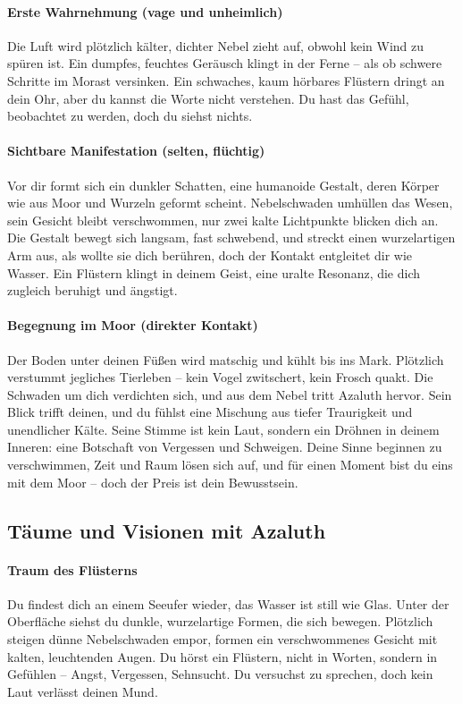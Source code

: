 \paragraph{Erste Wahrnehmung (vage und unheimlich)}
Die Luft wird plötzlich kälter, dichter Nebel zieht auf, obwohl kein Wind zu spüren ist.
Ein dumpfes, feuchtes Geräusch klingt in der Ferne – als ob schwere Schritte im Morast versinken.
Ein schwaches, kaum hörbares Flüstern dringt an dein Ohr, aber du kannst die Worte nicht verstehen.
Du hast das Gefühl, beobachtet zu werden, doch du siehst nichts.
\paragraph{Sichtbare Manifestation (selten, flüchtig)}
Vor dir formt sich ein dunkler Schatten, eine humanoide Gestalt, deren Körper wie aus Moor und Wurzeln geformt scheint.
Nebelschwaden umhüllen das Wesen, sein Gesicht bleibt verschwommen, nur zwei kalte Lichtpunkte blicken dich an.
Die Gestalt bewegt sich langsam, fast schwebend, und streckt einen wurzelartigen Arm aus, als wollte sie dich berühren, doch der Kontakt entgleitet dir wie Wasser.
Ein Flüstern klingt in deinem Geist, eine uralte Resonanz, die dich zugleich beruhigt und ängstigt.
\paragraph{Begegnung im Moor (direkter Kontakt)}
Der Boden unter deinen Füßen wird matschig und kühlt bis ins Mark. Plötzlich verstummt jegliches Tierleben – kein Vogel zwitschert, kein Frosch quakt.
Die Schwaden um dich verdichten sich, und aus dem Nebel tritt Azaluth hervor. Sein Blick trifft deinen, und du fühlst eine Mischung aus tiefer Traurigkeit und unendlicher Kälte.
Seine Stimme ist kein Laut, sondern ein Dröhnen in deinem Inneren: eine Botschaft von Vergessen und Schweigen.
Deine Sinne beginnen zu verschwimmen, Zeit und Raum lösen sich auf, und für einen Moment bist du eins mit dem Moor – doch der Preis ist dein Bewusstsein.
\subsection{Täume und Visionen mit Azaluth}
\paragraph{Traum des Flüsterns}
Du findest dich an einem Seeufer wieder, das Wasser ist still wie Glas. Unter der Oberfläche siehst du dunkle, wurzelartige Formen, die sich bewegen.
Plötzlich steigen dünne Nebelschwaden empor, formen ein verschwommenes Gesicht mit kalten, leuchtenden Augen.
Du hörst ein Flüstern, nicht in Worten, sondern in Gefühlen – Angst, Vergessen, Sehnsucht.
Du versuchst zu sprechen, doch kein Laut verlässt deinen Mund.
